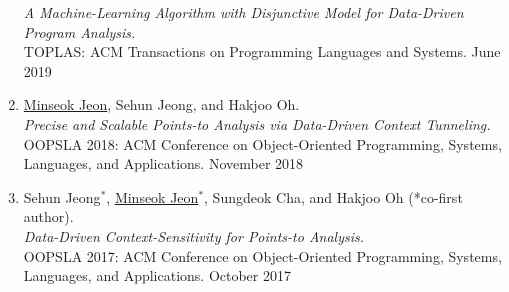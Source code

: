 \documentclass[letterpaper,11pt]{article}
\begin{document}
\begin{enumerate}
{  \textit{A Machine-Learning Algorithm with Disjunctive Model for Data-Driven Program Analysis.}\\
  TOPLAS: ACM Transactions on Programming Languages and Systems. June 2019
  }
  \item{\underline{Minseok Jeon}, Sehun Jeong, and Hakjoo Oh.\\
  \textit{Precise and Scalable Points-to Analysis via Data-Driven Context Tunneling.}\\
  OOPSLA 2018: ACM Conference on Object-Oriented Programming, Systems, Languages, and Applications. November 2018
  }
  \item {Sehun Jeong$^*$, \underline{Minseok Jeon}$^*$, Sungdeok Cha, and Hakjoo Oh  (*co-first
  author).\\\textit{Data-Driven Context-Sensitivity for Points-to Analysis.}\\
  OOPSLA 2017: ACM Conference on Object-Oriented Programming, Systems, Languages, and Applications. October 2017
  }
\end{enumerate}


  
\end{document}
